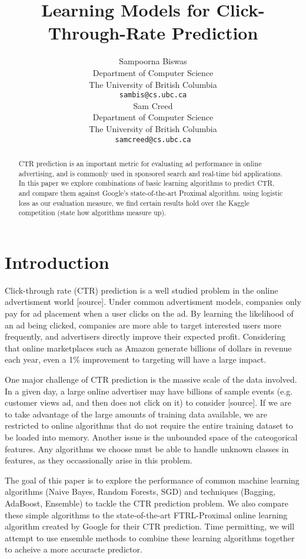 \documentclass{article} %
\title{Learning Models for Click-Through-Rate Prediction}
\author{
Sampoorna Biswas \\
Department of Computer Science\\
The University of British Columbia\\
\texttt{sambis@cs.ubc.ca} \\
\And
Sam Creed \\
Department of Computer Science\\
The University of British Columbia\\
\texttt{samcreed@cs.ubc.ca} \\
}
\begin{document}
\maketitle

\begin{abstract}
CTR prediction is an important metric for evaluating ad performance in online advertising, and is commonly used in sponsored search and real-time bid applications. In this paper we explore combinations of basic learning algorithms to predict CTR, and compare them against Google's state-of-the-art Proximal algorithm. using logistic loss as our evaluation measure, we find certain results hold over the Kaggle competition (state how algorithms measure up).
\end{abstract}

\section{Introduction}

Click-through rate (CTR) prediction is a well studied problem in the online advertisment world [source]. Under common advertisment models, companies only pay for ad placement when a user clicks on the ad. By learning the likelihood of an ad being clicked, companies are more able to target interested users more frequently, and advertisers directly improve their expected profit. Considering that online marketplaces such as Amazon generate billions of dollars in revenue each year, even a 1\% improvement to targeting will have a large impact.

One major challenge of CTR prediction is the massive scale of the data involved. In a given day, a large online advertiser may have billions of sample events (e.g. customer views ad, and then does not click on it) to consider [source]. If we are to take advantage of the large amounts of training data available, we are restricted to online algorithms that do not require the entire training dataset to be loaded into memory. Another issue is the unbounded space of the cateogorical features. Any algorithms we choose must be able to handle unknown classes in features, as they occassionally arise in this problem.

The goal of this paper is to explore the performance of common machine learning algorithms (Naive Bayes, Random Forests, SGD) and techniques (Bagging, AdaBoost, Ensemble) to tackle the CTR prediction problem. We also compare these simple algorithms to the state-of-the-art FTRL-Proximal online learning algorithm created by Google for their CTR prediction. Time permitting, we will attempt to use ensemble methods to combine these learning algorithms together to acheive a more accuracte predictor.
\end{document}
